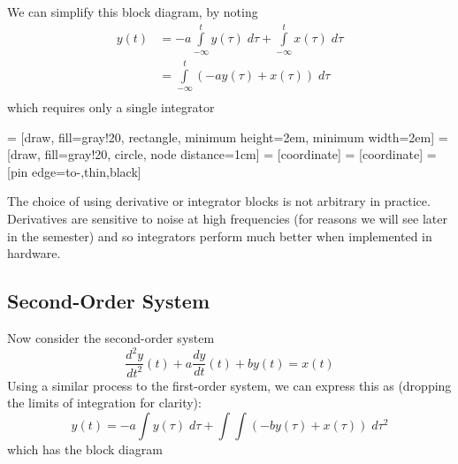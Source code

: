 We can simplify this block diagram, by noting
\begin{align*}
  y(t) &= -a\int\limits_{-\infty}^t y(\tau)\; d\tau + \int\limits_{-\infty}^t
  x(\tau)\; d\tau\\
  &= \int\limits_{-\infty}^t \left(-a y(\tau) +  x(\tau)\right)\; d\tau\\
\end{align*}
which requires only a single integrator
\begin{center}
   = [draw, fill=gray!20, rectangle, 
    minimum height=2em, minimum width=2em]
   = [draw, fill=gray!20, circle, node distance=1cm]
   = [coordinate]
   = [coordinate]
   = [pin edge={to-,thin,black}]
  
\end{center}

The choice of using derivative or integrator blocks is not arbitrary in practice. Derivatives are sensitive to noise at high frequencies (for reasons we will see later in the semester) and so integrators perform much better when implemented in hardware. 

\subsection*{Second-Order System}

Now consider the second-order system
\[
\frac{d^2y}{dt^2}(t) + a\frac{dy}{dt}(t)  + by(t)= x(t)
\]
Using a similar process to the first-order system, we can express this as (dropping the limits of integration for clarity):
\[
y(t) = -a \int y(\tau)\; d\tau + \int\int \left( -by(\tau) + x(\tau) \right) \; d\tau^2 
\]
which has the block diagram

